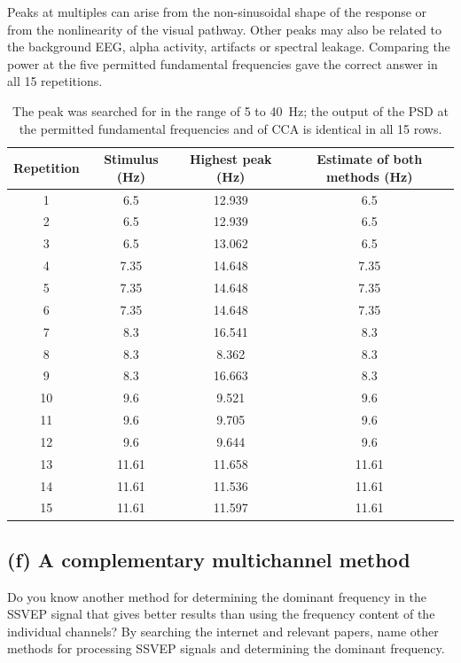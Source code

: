 Peaks at multiples can arise from the non-sinusoidal shape of the response or from the nonlinearity of the visual pathway. Other peaks may also be related to the background EEG, alpha activity, artifacts or spectral leakage. Comparing the power at the five permitted fundamental frequencies gave the correct answer in all 15 repetitions.

\begin{table}[H]
\centering
\caption{The peak was searched for in the range of 5 to 40~Hz; the output of the PSD at the permitted fundamental frequencies and of CCA is identical in all 15 rows.}
\begin{tabular}{@{}cccc@{}}
\toprule
\textbf{Repetition} & \textbf{Stimulus (Hz)} & \textbf{Highest peak (Hz)} & \textbf{Estimate of both methods (Hz)}\\
\midrule
1  & 6.5   & 12.939 & 6.5\\
2  & 6.5   & 12.939 & 6.5\\
3  & 6.5   & 13.062 & 6.5\\
4  & 7.35  & 14.648 & 7.35\\
5  & 7.35  & 14.648 & 7.35\\
6  & 7.35  & 14.648 & 7.35\\
7  & 8.3   & 16.541 & 8.3\\
8  & 8.3   & 8.362  & 8.3\\
9  & 8.3   & 16.663 & 8.3\\
10 & 9.6   & 9.521  & 9.6\\
11 & 9.6   & 9.705  & 9.6\\
12 & 9.6   & 9.644  & 9.6\\
13 & 11.61 & 11.658 & 11.61\\
14 & 11.61 & 11.536 & 11.61\\
15 & 11.61 & 11.597 & 11.61\\
\bottomrule
\end{tabular}
\end{table}

\subsection*{(f) A complementary multichannel method}
\begin{taskbox}
Do you know another method for determining the dominant frequency in the SSVEP signal that gives better results than using the frequency content of the individual channels? By searching the internet and relevant papers, name other methods for processing SSVEP signals and determining the dominant frequency.
\end{taskbox}

